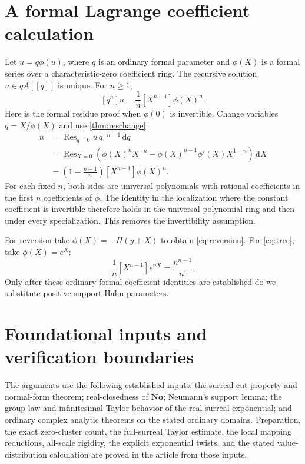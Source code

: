 \documentclass[11pt,oneside]{article}
\numberwithin{equation}{section}
\theoremstyle{definition}
\theoremstyle{remark}\newtheorem{remark}[theorem]{Remark}
\newcommand{\No}{\mathbf{No}}
\newcommand{\Res}{\operatorname{Res}}
\newcommand{\dd}{\,\mathrm d}
\begin{document}
\section{A formal Lagrange coefficient calculation}\label{app:lagrange}
Let $u=q\phi(u)$, where $q$ is an ordinary formal parameter and
$\phi(X)$ is a formal series over a characteristic-zero coefficient ring.
The recursive solution $u\in qA[[q]]$ is unique. For $n\geq1$,
\begin{equation}\label{eq:lagrange}
 [q^n]u=\frac1n[X^{n-1}]\phi(X)^n.
\end{equation}
Here is the formal residue proof when $\phi(0)$ is invertible. Change
variables $q=X/\phi(X)$ and use \cref{thm:reschange}:
\begin{align*}
 [q^n]u
 &=\Res_{q=0}u\,q^{-n-1}\dd q\\
 &=\Res_{X=0}\left(\phi(X)^nX^{-n}
       -\phi(X)^{n-1}\phi'(X)X^{1-n}\right)\dd X\\
 &=\left(1-\frac{n-1}{n}\right)[X^{n-1}]\phi(X)^n.
\end{align*}
For each fixed $n$, both sides are universal polynomials with rational
coefficients in the first $n$ coefficients of $\phi$. The identity in
the localization where the constant coefficient is invertible therefore
holds in the universal polynomial ring and then under every
specialization. This removes the invertibility assumption.

For reversion take $\phi(X)=-H(y+X)$ to obtain
\eqref{eq:reversion}. For \eqref{eq:tree}, take $\phi(X)=e^X$:
\[
 \frac1n[X^{n-1}]e^{nX}=\frac{n^{n-1}}{n!}.
\]
Only after these ordinary formal coefficient identities are established
do we substitute positive-support Hahn parameters.

\section{Foundational inputs and verification boundaries}
The arguments use the following established inputs: the surreal cut
property and normal-form theorem; real-closedness of $\No$; Neumann's
support lemma; the group law and infinitesimal Taylor behavior of the real
surreal exponential; and ordinary complex analytic theorems on the stated
ordinary domains. Preparation, the exact zero-cluster count, the
full-surreal Taylor estimate, the local mapping reductions, all-scale
rigidity, the explicit exponential twists, and the stated value-distribution
calculation are proved in the article from those inputs.
\end{document}
